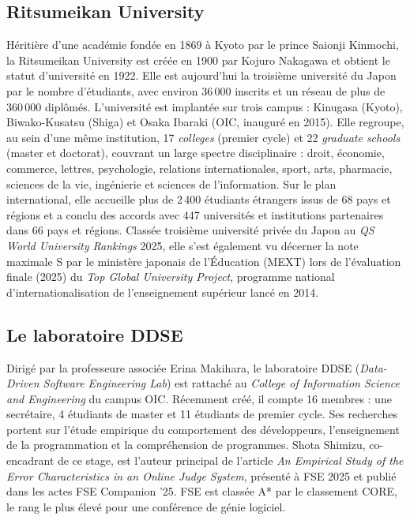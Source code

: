 \documentclass[11pt, a4paper]{article}
\begin{document}
\subsection{Ritsumeikan University}

Héritière d'une académie fondée en 1869 à Kyoto par le prince Saionji
Kinmochi, la Ritsumeikan University est créée en 1900 par Kojuro Nakagawa
et obtient le statut d'université en 1922. Elle est aujourd'hui la
troisième université du Japon par le nombre d'étudiants, avec environ
36\,000 inscrits et un réseau de plus de 360\,000 diplômés. L'université
est implantée sur trois campus : Kinugasa (Kyoto), Biwako-Kusatsu (Shiga)
et Osaka Ibaraki (OIC, inauguré en 2015). Elle regroupe, au sein d'une
même institution, 17 \textit{colleges} (premier cycle) et 22 \textit{graduate schools} (master et doctorat), couvrant un large spectre disciplinaire :
droit, économie, commerce, lettres, psychologie, relations internationales,
sport, arts, pharmacie, sciences de la vie, ingénierie et sciences de
l'information. Sur le plan international, elle accueille plus de
2\,400 étudiants étrangers issus de 68 pays et régions et a conclu des accords avec 447
universités et institutions partenaires dans 66 pays et régions. Classée troisième
université privée du Japon au \textit{QS World University Rankings} 2025, elle
s'est également vu décerner la note maximale \og S \fg{} par le ministère
japonais de l'Éducation (MEXT) lors de l'évaluation finale (2025) du
\textit{Top Global University Project}, programme national
d'internationalisation de l'enseignement supérieur lancé en 2014.

\subsection{Le laboratoire DDSE}

Dirigé par la professeure associée Erina Makihara, le laboratoire DDSE
(\textit{Data-Driven Software Engineering Lab}) est rattaché au
\textit{College of Information Science and Engineering} du campus OIC.
Récemment créé, il compte 16 membres : une secrétaire, 4 étudiants de master
et 11 étudiants de premier cycle. Ses recherches portent sur l'étude empirique
du comportement des développeurs, l'enseignement de la programmation et la
compréhension de programmes. Shota Shimizu, co-encadrant de ce stage, est
l'auteur principal de l'article \textit{An Empirical Study of the Error
Characteristics in an Online Judge System}, présenté à FSE 2025 et publié
dans les actes FSE Companion '25. FSE est classée A* par le classement CORE,
le rang le plus élevé pour une conférence de génie logiciel.
\end{document}
